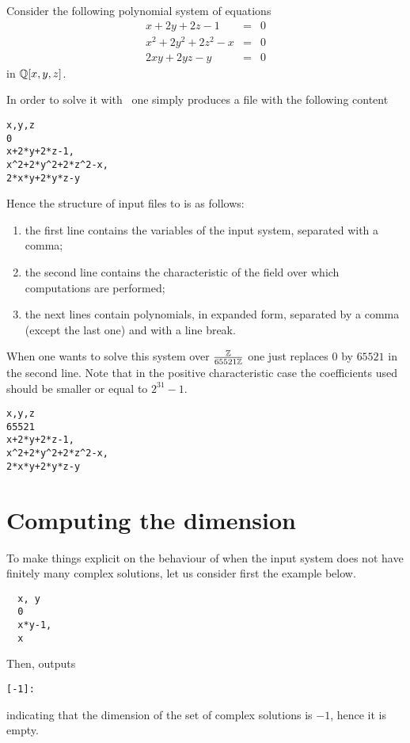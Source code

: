 \documentclass[a4paper,english,11pt]{scrartcl}
\theoremstyle{definition}
\theoremstyle{remark}
\begin{document}
Consider the following polynomial system of equations
\[
  \begin{array}{rcl}
    x+2 y+2 z-1 &= &0\\
    x^2+2 y^2+2 z^2-x &= &0\\
    2 x y+2 y z-y &= &0
  \end{array}
\]
in $\mathbb{Q}[x,y,z]$.

In order to solve it with \msolve~one simply produces a file with the following content
\begin{tcolorbox}
\begin{verbatim}
x,y,z
0
x+2*y+2*z-1,
x^2+2*y^2+2*z^2-x,
2*x*y+2*y*z-y
\end{verbatim}  
\end{tcolorbox}
Hence the structure of input files to \msolve is as follows:
\begin{enumerate}
\item the first line contains the variables of the input system, separated with
  a comma; 
\item the second line contains the characteristic of the field over which
  computations are performed; 
\item the next lines contain polynomials, in expanded form, separated by a comma
  (except the last one) and with a line break. 
\end{enumerate}



When one wants to solve this system over $\frac{\mathbb{Z}}{65521\mathbb{Z}}$ one just replaces
$0$ by $65521$ in the second line. Note that in the positive characteristic case
the coefficients used should be smaller or equal to $2^{31}-1$.

\begin{tcolorbox}
\begin{verbatim}
x,y,z
65521
x+2*y+2*z-1,
x^2+2*y^2+2*z^2-x,
2*x*y+2*y*z-y
\end{verbatim}  
\end{tcolorbox}

\section{Computing the dimension}\label{sec:dim}

To make things explicit on the behaviour of \msolve when the input system
does not have finitely many complex solutions, let us consider first the example
below.
\begin{tcolorbox}
\begin{verbatim}
  x, y
  0
  x*y-1,
  x
\end{verbatim}
\end{tcolorbox}
Then, \msolve outputs
\begin{tcolorbox}
\begin{verbatim}
[-1]:
\end{verbatim}
\end{tcolorbox}
indicating that the dimension of the set of complex solutions is $-1$, hence it
is empty.
\end{document}
